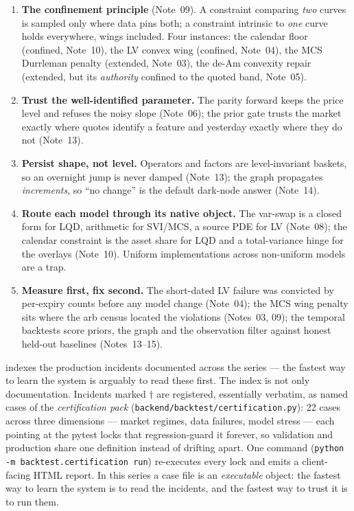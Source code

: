 \documentclass[11pt]{article}
\begin{document}
\begin{enumerate}[leftmargin=1.6em]
\item \textbf{The confinement principle} (Note~09). A constraint comparing
\emph{two} curves is sampled only where data pins both; a constraint
intrinsic to \emph{one} curve holds everywhere, wings included. Four
instances: the calendar floor (confined, Note~10), the LV convex wing
(confined, Note~04), the MCS Durrleman penalty (extended, Note~03), the
de-Am convexity repair (extended, but its \emph{authority} confined to the
quoted band, Note~05).
\item \textbf{Trust the well-identified parameter.} The parity forward keeps
the price level and refuses the noisy slope (Note~06); the prior gate trusts
the market exactly where quotes identify a feature and yesterday exactly
where they do not (Note~13).
\item \textbf{Persist shape, not level.} Operators and factors are
level-invariant baskets, so an overnight jump is never damped
(Note~13); the graph propagates \emph{increments}, so ``no change'' is the
default dark-node answer (Note~14).
\item \textbf{Route each model through its native object.} The var-swap is
a closed form for LQD, arithmetic for SVI/MCS, a source PDE for LV
(Note~08); the calendar constraint is the asset share for LQD and a
total-variance hinge for the overlays (Note~10). Uniform implementations
across non-uniform models are a trap.
\item \textbf{Measure first, fix second.} The short-dated LV failure was
convicted by per-expiry counts before any model change (Note~04); the MCS
wing penalty sits where the arb census located the violations (Notes~03,
09); the temporal backtests score priors, the graph and the observation
filter against honest held-out baselines (Notes~13--15).
\end{enumerate}

 indexes the production incidents documented across the
series --- the fastest way to learn the system is arguably to read these
first. The index is not only documentation. Incidents marked $\dagger$ are
registered, essentially verbatim, as named cases of the \emph{certification
pack} (\texttt{backend/backtest/certification.py}): 22 cases across three
dimensions --- market regimes, data failures, model stress --- each pointing
at the pytest locks that regression-guard it forever, so validation and
production share one definition instead of drifting apart. One command
(\texttt{python -m backtest.certification run}) re-executes every lock and
emits a client-facing HTML report. In this series a case file is an
\emph{executable} object: the fastest way to learn the system is to read the
incidents, and the fastest way to trust it is to run them.
\end{document}
